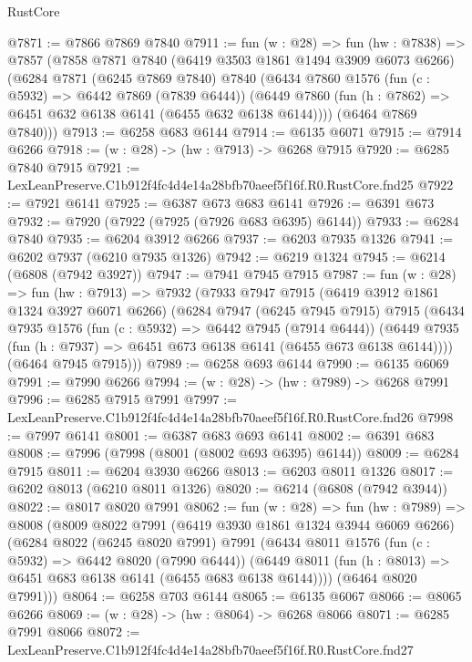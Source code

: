 \begin{lexlean}{RustCore}
\begin{coremodule}
@7871 := @7866 @7869 @7840
@7911 := fun (w : @28) =>
  fun (hw : @7838) =>
  @7857
    (@7858
      @7871
      @7840
      (@6419 @3503 @1861 @1494 @3909 @6073 @6266)
      (@6284
        @7871
        (@6245 @7869 @7840)
        @7840
        (@6434
          @7860
          @1576
          (fun (c : @5932) => @6442 @7869 (@7839 @6444))
          (@6449 @7860 (fun (h : @7862) => @6451 @632 @6138 @6141 (@6455 @632 @6138 @6144))))
        (@6464 @7869 @7840)))
@7913 := @6258 @683 @6144
@7914 := @6135 @6071
@7915 := @7914 @6266
@7918 := (w : @28) -> (hw : @7913) -> @6268 @7915
@7920 := @6285 @7840 @7915
@7921 := LexLeanPreserve.C1b912f4fc4d4e14a28bfb70aeef5f16f.R0.RustCore.fnd25
@7922 := @7921 @6141
@7925 := @6387 @673 @683 @6141
@7926 := @6391 @673
@7932 := @7920 (@7922 (@7925 (@7926 @683 @6395) @6144))
@7933 := @6284 @7840
@7935 := @6204 @3912 @6266
@7937 := @6203 @7935 @1326
@7941 := @6202 @7937 (@6210 @7935 @1326)
@7942 := @6219 @1324
@7945 := @6214 (@6808 (@7942 @3927))
@7947 := @7941 @7945 @7915
@7987 := fun (w : @28) =>
  fun (hw : @7913) =>
  @7932
    (@7933
      @7947
      @7915
      (@6419 @3912 @1861 @1324 @3927 @6071 @6266)
      (@6284
        @7947
        (@6245 @7945 @7915)
        @7915
        (@6434
          @7935
          @1576
          (fun (c : @5932) => @6442 @7945 (@7914 @6444))
          (@6449 @7935 (fun (h : @7937) => @6451 @673 @6138 @6141 (@6455 @673 @6138 @6144))))
        (@6464 @7945 @7915)))
@7989 := @6258 @693 @6144
@7990 := @6135 @6069
@7991 := @7990 @6266
@7994 := (w : @28) -> (hw : @7989) -> @6268 @7991
@7996 := @6285 @7915 @7991
@7997 := LexLeanPreserve.C1b912f4fc4d4e14a28bfb70aeef5f16f.R0.RustCore.fnd26
@7998 := @7997 @6141
@8001 := @6387 @683 @693 @6141
@8002 := @6391 @683
@8008 := @7996 (@7998 (@8001 (@8002 @693 @6395) @6144))
@8009 := @6284 @7915
@8011 := @6204 @3930 @6266
@8013 := @6203 @8011 @1326
@8017 := @6202 @8013 (@6210 @8011 @1326)
@8020 := @6214 (@6808 (@7942 @3944))
@8022 := @8017 @8020 @7991
@8062 := fun (w : @28) =>
  fun (hw : @7989) =>
  @8008
    (@8009
      @8022
      @7991
      (@6419 @3930 @1861 @1324 @3944 @6069 @6266)
      (@6284
        @8022
        (@6245 @8020 @7991)
        @7991
        (@6434
          @8011
          @1576
          (fun (c : @5932) => @6442 @8020 (@7990 @6444))
          (@6449 @8011 (fun (h : @8013) => @6451 @683 @6138 @6141 (@6455 @683 @6138 @6144))))
        (@6464 @8020 @7991)))
@8064 := @6258 @703 @6144
@8065 := @6135 @6067
@8066 := @8065 @6266
@8069 := (w : @28) -> (hw : @8064) -> @6268 @8066
@8071 := @6285 @7991 @8066
@8072 := LexLeanPreserve.C1b912f4fc4d4e14a28bfb70aeef5f16f.R0.RustCore.fnd27

\end{coremodule}
\end{lexlean}
